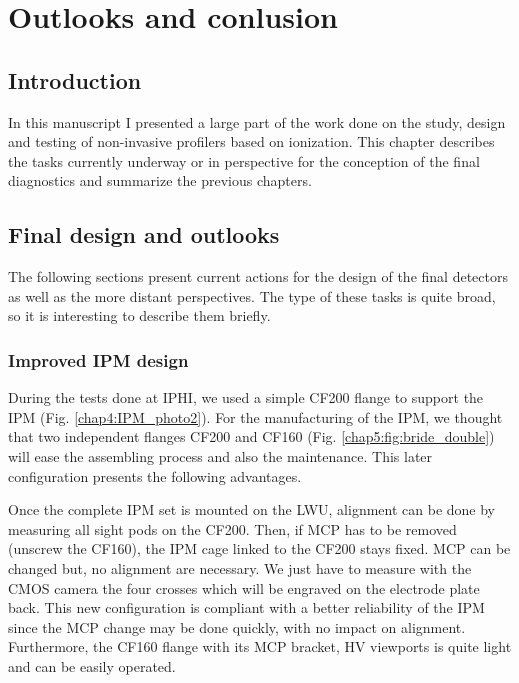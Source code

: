 \chapter{Outlooks and conlusion}
\cleardoublepage

\minitoc
\section{Introduction}
\begin{refsection}
  In this manuscript I presented a large part of the work done on the study, design and testing of non-invasive profilers based on ionization. This chapter describes the tasks currently underway or in perspective for the conception of the final diagnostics and summarize the previous chapters. 

  \section{Final design and outlooks}
  The following sections present current actions for the design of the final detectors as well as the more distant perspectives. The type of these tasks is quite broad, so it is interesting to describe them briefly.

  \subsection{Improved IPM design}
  During the tests done at IPHI, we used a simple CF200 flange to support the IPM (Fig. \ref{chap4:IPM_photo2}). For the manufacturing of the IPM, we thought that two independent flanges CF200 and CF160 (Fig. \ref{chap5:fig:bride_double}) will ease the assembling process and also the maintenance. This later configuration presents the following advantages.

  

  Once the complete IPM set is mounted on the LWU, alignment can be done by measuring all sight pods on the CF200. Then, if MCP has to be removed (unscrew the CF160), the IPM cage linked to the CF200 stays fixed. MCP can be changed but, no alignment are necessary. We just have to measure with the CMOS camera the four crosses which will be engraved on the electrode plate back. This new configuration is compliant with a better reliability of the IPM since the MCP change may be done quickly, with no impact on alignment. Furthermore, the CF160 flange with its MCP bracket, HV viewports is quite light and can be easily operated.


\end{refsection}
